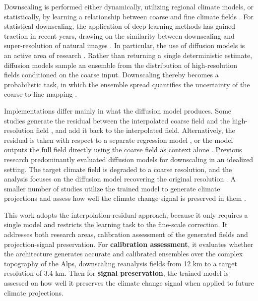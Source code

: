 \documentclass[
]{krantz}
\begin{document}
Downscaling is performed either dynamically, utilizing regional climate models, or statistically, by learning a relationship between coarse and fine climate fields \citep{ling2024}.
For statistical downscaling, the application of deep learning methods has gained traction in recent years, drawing on the similarity between downscaling
and super-resolution of natural images \citep{addison2022, merizzi2024}. In particular, the use of diffusion models is an active area of research \citep{springenberg2026}.
Rather than returning a single deterministic estimate, diffusion models sample an ensemble from the distribution of high-resolution fields conditioned on the coarse input.
Downscaling thereby becomes a probabilistic task, in which the ensemble spread quantifies the uncertainty of the coarse-to-fine mapping \citep{watt2024, springenberg2026}.

Implementations differ mainly in what the diffusion model produces. Some studies generate the residual between the interpolated coarse field and the high-resolution field \citep{watt2024, lopezgomez2025},
and add it back to the interpolated field. Alternatively, the residual is taken with respect to a separate regression model \citep{mardani2025, tomasi2025},
or the model outputs the full field directly using the coarse field as context alone \citep{addison2026, merizzi2024}.
Previous research predominantly evaluated diffusion models for downscaling in an idealized setting. The target climate field is degraded to a coarse resolution, and the analysis focuses on the diffusion model
recovering the original resolution \citep{merizzi2024, watt2024}. A smaller number of studies utilize the trained model to generate climate projections and assess how well the climate change signal is preserved in them \citep{addison2026, aich2026}.

This work adopts the interpolation-residual approach, because it only requires a single model and restricts the learning task to the fine-scale correction.
It addresses both research areas, calibration assessment of the generated fields and projection-signal preservation.
For \textbf{calibration assessment}, it evaluates whether the \citet{watt2024} architecture generates accurate and calibrated ensembles over the complex topography of the Alps, downscaling reanalysis fields from 12 km to a target resolution of 3.4 km.
Then for \textbf{signal preservation}, the trained model is assessed on how well it preserves the climate change signal when applied to future climate projections.
\end{document}
